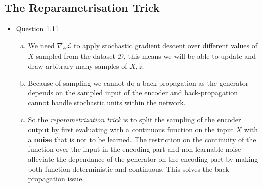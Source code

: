 \documentclass{article}
\begin{document}
  \subsection{The Reparametrisation Trick}
    \begin{itemize}
      \item Question 1.11
      \begin{enumerate}[(a)]
        \item We need $\nabla_{\phi} \mathcal{L}$ to apply stochastic gradient descent over different values of $X$ sampled from the dataset $\mathcal{D}$, this means we will be able to update and draw arbitrary many samples of $X, z$. 
        \item Because of sampling we cannot do a back-propagation as the generator depends on the sampled input of the encoder and back-propagation cannot handle stochastic units within the network. 
        \item So the \textit{reparametrization trick} is to split the sampling of the encoder output by first evaluating with a continuous function on the input $X$ with a \textbf{noise} that is not to be learned. The restriction on the continuity of the function over the input in the encoding part and non-learnable noise alleviate the dependance of the generator on the encoding part by making both function deterministic and continuous. This solves the back-propagation issue. 
      \end{enumerate}
    \end{itemize}
\end{document}
